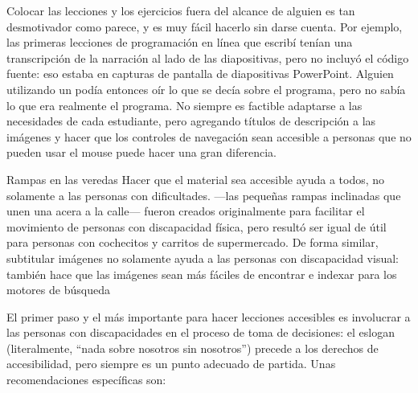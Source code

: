
Colocar las lecciones y los ejercicios fuera del alcance de alguien es tan desmotivador como parece,
y es muy fácil hacerlo sin darse cuenta.
Por ejemplo,
las primeras lecciones de programación en línea que escribí tenían una transcripción de la narración
al lado de las diapositivas,
pero no incluyó el código fuente:
eso estaba en capturas de pantalla de diapositivas PowerPoint.
Alguien utilizando un 
podía entonces oír lo que se decía sobre el programa,
pero no sabía lo que era realmente el programa.
No siempre es factible adaptarse a las necesidades de cada estudiante,
pero agregando títulos de descripción a las imágenes
y hacer que los controles de navegación sean accesible a personas que no pueden usar el mouse
puede hacer una gran diferencia.

\begin{aside}{Rampas en las veredas}
  Hacer que el material sea accesible ayuda a todos,
  no solamente a las personas con dificultades.
---las pequeñas rampas inclinadas que unen una acera a la calle---
  fueron creados originalmente para facilitar el movimiento de personas con discapacidad física,
  pero resultó ser igual de útil para personas con cochecitos y carritos de supermercado.
  De forma similar,
  subtitular imágenes no solamente ayuda a las personas con discapacidad visual:
  también hace que las imágenes sean más fáciles de encontrar e indexar para los motores de búsqueda
\end{aside}

El primer paso y el más importante para hacer lecciones accesibles es
involucrar a las personas con discapacidades en el proceso de toma de decisiones:
el eslogan \emph{}
(literalmente, ``nada sobre nosotros sin nosotros'')
precede a los derechos de accesibilidad,
pero siempre es un punto adecuado de partida.
Unas recomendaciones específicas son:

